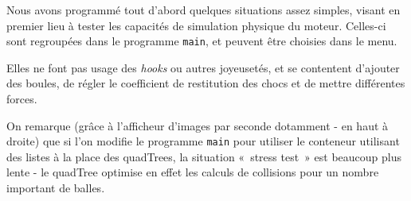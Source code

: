 \documentclass[a4paper]{scrartcl}
\begin{document}
Nous avons programmé tout d'abord quelques situations assez simples,
visant en premier lieu à tester les capacités de simulation physique
du moteur. Celles-ci sont regroupées dans le programme \texttt{main},
et peuvent être choisies dans le menu.

Elles ne font pas usage des \emph{hooks} ou autres joyeusetés, et se
contentent d'ajouter des boules, de régler le coefficient de
restitution des chocs et de mettre différentes forces.

On remarque (grâce à l'afficheur d'images par seconde dotamment - en
haut à droite) que si l'on modifie le programme \texttt{main} pour
utiliser le conteneur utilisant des listes à la place des quadTrees,
la situation «~stress test~» est beaucoup plus lente - le quadTree
optimise en effet les calculs de collisions pour un nombre important
de balles.
\end{document}
